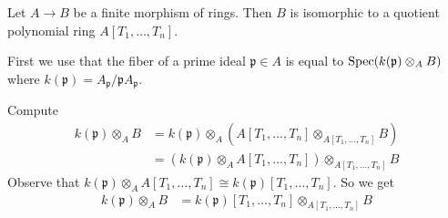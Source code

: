 \newcommand{\sheet}{8}




\maketitle

\begin{exercise}{3}
    Let $A \rightarrow B$ be a finite morphism of rings. Then $B$ is isomorphic
    to a quotient polynomial ring $A[T_1, \ldots, T_n]$.

    First we use that the fiber of a prime ideal $\mathfrak{p} \in A$ is equal to
    $\operatorname{Spec}(k(\mathfrak{p}) \otimes_A B)$ where $k(\mathfrak{p}) = A_\mathfrak{p}
    / \mathfrak{p} A_\mathfrak{p}$.

    Compute
    \begin{align*}
        k(\mathfrak{p}) \otimes_A B &= k(\mathfrak{p}) \otimes_A (A[T_1, \ldots,
        T_n] \otimes_{A[T_1, \ldots, T_n]} B) \\
        &= (k(\mathfrak{p}) \otimes_A A[T_1, \ldots, T_n]) \otimes_{A[T_1,
        \ldots, T_n]} B
    \end{align*}
    Observe that $k(\mathfrak{p}) \otimes_A A[T_1, \ldots, T_n] \cong
    k(\mathfrak{p})[T_1, \ldots, T_n]$.
    So we get
    \begin{align*}
        k(\mathfrak{p}) \otimes_A B &= k(\mathfrak{p})[T_1, \ldots, T_n]
        \otimes_{A[T_1, \ldots, T_n]} B
    \end{align*}
\end{exercise}


